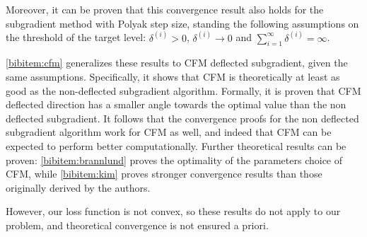 Moreover, it can be proven that this convergence result also holds for the subgradient method with Polyak step size, standing the following assumptions on the threshold of the target level: $\delta^{(i)} > 0$, $\delta^{(i)} \rightarrow 0$ and $\sum_{i=1}^{\infty} \delta^{(i)} = \infty$. 

\ref{bibitem:cfm} generalizes these results to CFM deflected subgradient, given the same assumptions. Specifically, it shows that CFM is theoretically at least as good as the non-deflected subgradient algorithm. Formally, it is proven that CFM deflected direction has a smaller angle towards the optimal value than the non deflected subgradient. It follows that the convergence proofs for the non deflected subgradient algorithm work for CFM as well, and indeed that CFM can be expected to perform better computationally. Further theoretical results can be proven: \ref{bibitem:brannlund} proves the optimality of the parameters choice of CFM, while \ref{bibitem:kim} proves stronger convergence results than those originally derived by the authors.

However, our loss function is not convex, so these results do not apply to our problem, and theoretical convergence is not ensured a priori.